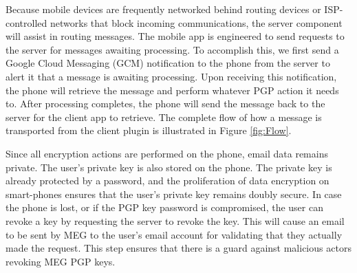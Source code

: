 \documentclass{sig-alternate-05-2015}
\begin{document}
\par Because mobile devices are frequently networked behind routing devices or ISP-controlled networks that block incoming communications, the server component will assist in routing messages. The mobile app is engineered to send requests to the server for messages awaiting processing. To accomplish this, we first send a Google Cloud Messaging (GCM) notification to the phone from the server to alert it that a message is awaiting processing. Upon receiving this notification, the phone will retrieve the message and perform whatever PGP action it needs to. After processing completes, the phone will send the message back to the server for the client app to retrieve. The complete flow of how a message is transported from the client plugin is illustrated in Figure \ref{fig:Flow}.

\par Since all encryption actions are performed on the phone, email data remains private. The user's private key is also stored on the phone. The private key is already protected by a password, and the proliferation of data encryption on smart-phones ensures that the user's private key remains doubly secure. In case the phone is lost, or if the PGP key password is compromised, the user can revoke a key by requesting the server to revoke the key. This will cause an email to be sent by MEG to the user's email account for validating that they actually made the request. This step ensures that there is a guard against malicious actors revoking MEG PGP keys.
\end{document}
